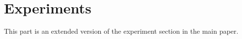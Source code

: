 \documentclass{article}
\begin{document}
%
%



\section{Experiments}

This part is an extended version of the experiment section in the main paper.
\end{document}
